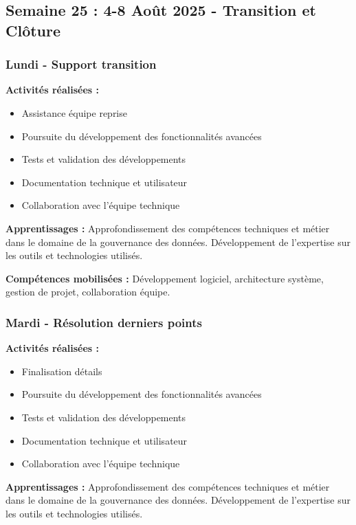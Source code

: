 \subsection{Semaine 25 : 4-8 Août 2025 - Transition et Clôture}

\subsubsection{Lundi - Support transition}

\textbf{Activités réalisées :}
\begin{itemize}
    \item Assistance équipe reprise
    \item Poursuite du développement des fonctionnalités avancées
    \item Tests et validation des développements
    \item Documentation technique et utilisateur
    \item Collaboration avec l'équipe technique
\end{itemize}

\textbf{Apprentissages :}
Approfondissement des compétences techniques et métier dans le domaine de la gouvernance des données. Développement de l'expertise sur les outils et technologies utilisés.

\textbf{Compétences mobilisées :}
Développement logiciel, architecture système, gestion de projet, collaboration équipe.

\subsubsection{Mardi - Résolution derniers points}

\textbf{Activités réalisées :}
\begin{itemize}
    \item Finalisation détails
    \item Poursuite du développement des fonctionnalités avancées
    \item Tests et validation des développements
    \item Documentation technique et utilisateur
    \item Collaboration avec l'équipe technique
\end{itemize}

\textbf{Apprentissages :}
Approfondissement des compétences techniques et métier dans le domaine de la gouvernance des données. Développement de l'expertise sur les outils et technologies utilisés.

